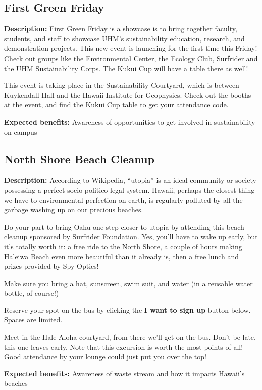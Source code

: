 \subsection{First Green Friday}

\textbf{Description:} First Green Friday is a showcase is to bring together faculty, students, and staff to showcase UHM's sustainability education, research, and demonstration projects. This new event is launching for the first time this Friday! Check out groups like the Environmental Center, the Ecology Club, Surfrider and the UHM Sustainability Corps. The Kukui Cup will have a table there as well!

This event is taking place in the Sustainability Courtyard, which is between Kuykendall Hall and the Hawaii Institute for Geophysics. Check out the booths at the event, and find the Kukui Cup table to get your attendance code.

\vspace{2ex}
\textbf{Expected benefits:} Awareness of opportunities to get involved in sustainability on campus


\subsection{North Shore Beach Cleanup}

\textbf{Description:} According to Wikipedia, ``utopia'' is an ideal community or society possessing a perfect socio-politico-legal system. Hawaii, perhaps the closest thing we have to environmental perfection on earth, is regularly polluted by all the garbage washing up on our precious beaches.

Do your part to bring Oahu one step closer to utopia by attending this beach cleanup sponsored by Surfrider Foundation. Yes, you'll have to wake up early, but it's totally worth it: a free ride to the North Shore, a couple of hours making Haleiwa Beach even more beautiful than it already is, then a free lunch and prizes provided by Spy Optics!

Make sure you bring a hat, sunscreen, swim suit, and water (in a reusable water bottle, of course!)

Reserve your spot on the bus by clicking the \textbf{I want to sign up} button below. Spaces are limited.

Meet in the Hale Aloha courtyard, from there we'll get on the bus. Don't be late, this one leaves early. Note that this excursion is worth the most points of all! Good attendance by your lounge could just put you over the top!

\vspace{2ex}
\textbf{Expected benefits:} Awareness of waste stream and how it impacts Hawaii's beaches
